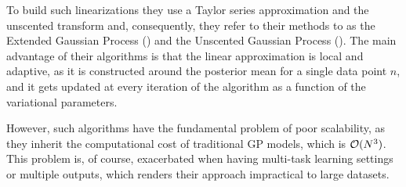 To build such linearizations they use a Taylor series approximation and the unscented transform 
and, consequently, they refer to their methods to as the Extended Gaussian Process (\egp) and 
the Unscented Gaussian Process (\ugp). 
The main advantage of their algorithms is that the linear
approximation is local and adaptive, as it is constructed around the posterior mean for a
single data point $n$, and it gets updated at every iteration of the algorithm as a function
of the variational parameters. 

However, such algorithms have the fundamental problem of poor scalability, as they 
inherit the computational cost of traditional GP models, which is $\mathcal{O}(N^3)$. This 
problem is, of course, exacerbated when having multi-task learning settings or multiple
outputs, which renders their approach impractical to large datasets.  


